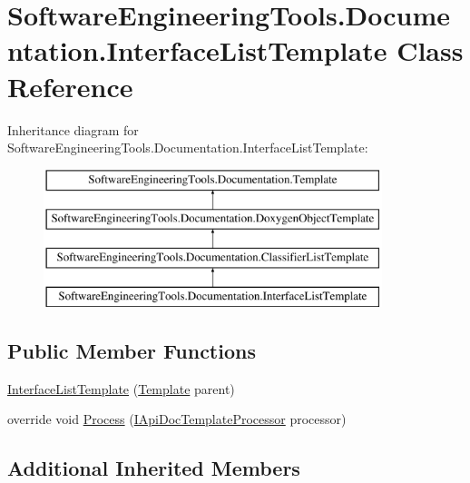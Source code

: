 \hypertarget{class_software_engineering_tools_1_1_documentation_1_1_interface_list_template}{\section{Software\+Engineering\+Tools.\+Documentation.\+Interface\+List\+Template Class Reference}
\label{class_software_engineering_tools_1_1_documentation_1_1_interface_list_template}
}
Inheritance diagram for Software\+Engineering\+Tools.\+Documentation.\+Interface\+List\+Template\+:\begin{figure}[H]
\begin{center}
\leavevmode
\includegraphics[height=4.000000cm]{class_software_engineering_tools_1_1_documentation_1_1_interface_list_template}
\end{center}
\end{figure}
\subsection*{Public Member Functions}
\begin{DoxyCompactItemize}
\item 
\hyperlink{class_software_engineering_tools_1_1_documentation_1_1_interface_list_template_a2144d407d11c4992779ca081a291855e}{Interface\+List\+Template} (\hyperlink{class_software_engineering_tools_1_1_documentation_1_1_template}{Template} parent)
\item 
override void \hyperlink{class_software_engineering_tools_1_1_documentation_1_1_interface_list_template_a9c3f88c7e8e3444af953ccc3b926ee13}{Process} (\hyperlink{interface_software_engineering_tools_1_1_documentation_1_1_i_api_doc_template_processor}{I\+Api\+Doc\+Template\+Processor} processor)
\end{DoxyCompactItemize}
\subsection*{Additional Inherited Members}


